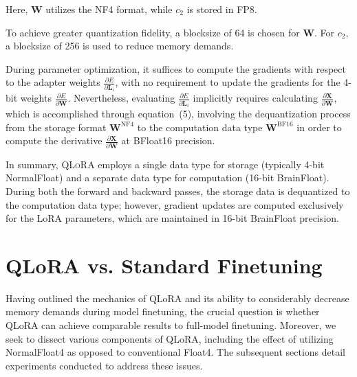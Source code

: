 Here, $\mathbf{W}$ utilizes the NF4 format, while $c_2$ is stored in FP8.

To achieve greater quantization fidelity, a blocksize of 64 is chosen for $\mathbf{W}$. For $c_2$, a blocksize of 256 is used to reduce memory demands.

During parameter optimization, it suffices to compute the gradients with respect to the adapter weights $\frac{\partial E}{\partial \mathbf{L}_i}$, with no requirement to update the gradients for the 4-bit weights $\frac{\partial E}{\partial \mathbf{W}}$. Nevertheless, evaluating $\frac{\partial E}{\partial \mathbf{L}_i}$ implicitly requires calculating $\frac{\partial \mathbf{X}}{\partial \mathbf{W}}$, which is accomplished through equation~(5), involving the dequantization process from the storage format $\mathbf{W}^{\text{NF4}}$ to the computation data type $\mathbf{W}^{\text{BF16}}$ in order to compute the derivative $\frac{\partial \mathbf{X}}{\partial \mathbf{W}}$ at BFloat16 precision.

In summary, \textsc{QLoRA} employs a single data type for storage (typically 4-bit NormalFloat) and a separate data type for computation (16-bit BrainFloat). During both the forward and backward passes, the storage data is dequantized to the computation data type; however, gradient updates are computed exclusively for the LoRA parameters, which are maintained in 16-bit BrainFloat precision.

\section{QLoRA vs. Standard Finetuning}
\label{sec:comp_to_std}

Having outlined the mechanics of QLoRA and its ability to considerably decrease memory demands during model finetuning, the crucial question is whether QLoRA can achieve comparable results to full-model finetuning. Moreover, we seek to dissect various components of QLoRA, including the effect of utilizing NormalFloat4 as opposed to conventional Float4. The subsequent sections detail experiments conducted to address these issues.

